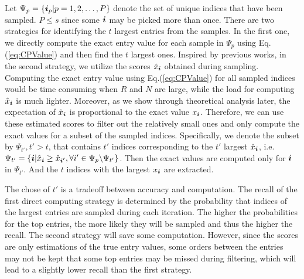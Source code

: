 \documentclass[letterpaper]{article}
\newcommand{\V}[1]{{\boldsymbol{{\MakeLowercase{#1}}}}}
\newcommand{\predx}{\hat{x}_{\V{i}}}
\newcommand{\Eqn}[1]{Eq.(\ref{eq:#1})}
\begin{document}
Let $\Psi_p = \{\V{i}_p|p = 1,2,\ldots,P\}$ 
denote the set of unique indices that have been sampled. 
$P\leq s$ since some $\V{i}$ may be picked more than once. 
There are two strategies for identifying the $t$ largest entries from the samples. 
In the first one, 
we directly compute the exact entry value for each sample in $\Psi_{p}$ using \Eqn{CPValue}
and then find the $t$ largest ones. 
Inspired by previous works, in the second strategy, 
we utilize the scores $\predx$ obtained during sampling. 
Computing the exact entry value using \Eqn{CPValue} for all sampled indices 
would be time consuming when $R$ and $N$ are large, 
while the load for computing $\predx$ is much lighter. 
Moreover, as we show through theoretical analysis later, 
the expectation of $\predx$ is proportional to the exact value $x_{\V{i}}$. 
Therefore, we can use these estimated scores to filter out the relatively small ones 
and only compute the exact values for a subset of the sampled indices. 
Specifically, we denote the subset by $\Psi_{t'},t'>t$, 
that contains $t'$ indices corresponding to the $t'$ largest $\predx$, i.e.
$
    \Psi_{t'} = \{ \V{i} | \predx \geq \hat{x}_{\V{i'}},
                           \forall i'\in \Psi_{p} \backslash \Psi_{t'}
                \}
$.
Then the exact values  are computed only for $\V{i}$ in $\Psi_{t'}$. 
And the $t$ indices with the largest $x_{\V{i}}$ are extracted.

The chose of $t'$ is a tradeoff between accuracy and computation. 
The recall of the first direct computing strategy is determined by the probability 
that indices of the largest entries are sampled during each iteration. 
The higher the probabilities for the top entries, the more likely they will be sampled 
and thus the higher the recall. 
The second strategy will save some computation. 
However, since the scores are only estimations of the true entry values, 
some orders between the entries may not be kept 
that some top entries may be missed during filtering, 
which will lead to a slightly lower recall than the first strategy.
\end{document}
